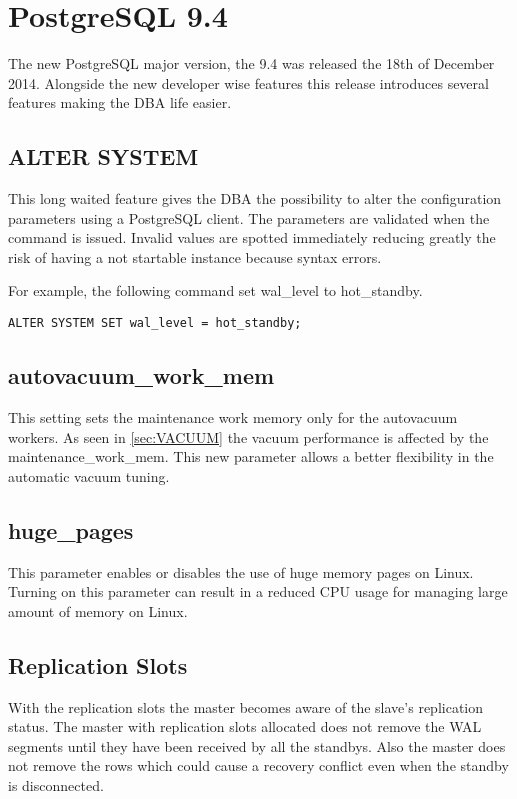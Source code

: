 \chapter{PostgreSQL 9.4}

The new PostgreSQL major version, the 9.4 was released the 18th of December 2014. Alongside the
new developer wise features this release introduces several features making the DBA life easier.

\section{ALTER SYSTEM}
This long waited feature gives the DBA the possibility to alter the configuration parameters
using a PostgreSQL client. The parameters are validated when the command is issued. Invalid values
are spotted immediately reducing greatly the risk of having a not startable instance because syntax
errors.

For example, the following command set wal\_level to hot\_standby. 
\begin{lstlisting}[style=pgsql]
 ALTER SYSTEM SET wal_level = hot_standby;

\end{lstlisting}

\section{autovacuum\_work\_mem}
This setting sets the maintenance work memory only for the autovacuum workers. As seen in
\ref{sec:VACUUM} the vacuum performance is affected by the maintenance\_work\_mem. This new
parameter allows a better flexibility in the automatic vacuum tuning.


\section{huge\_pages}
This parameter enables or disables the use of huge memory pages on Linux. Turning on this parameter can
result in a reduced CPU usage for managing large amount of memory on Linux.

\section{Replication Slots}
With the replication slots the master becomes aware of the slave's replication status. The master
with replication slots allocated does not remove the WAL segments until they have been received by all
the standbys. Also the master does not remove the rows which could cause a recovery conflict even when
the standby is disconnected. 

